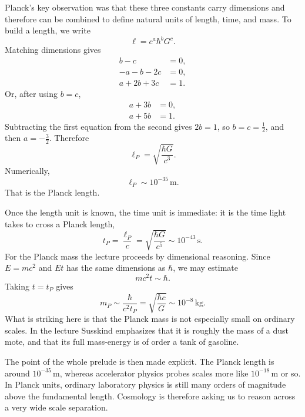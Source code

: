 Planck's key observation was that these three constants carry dimensions and therefore can be combined to define natural units of length, time, and mass. To build a length, we write
\begin{equation}
\ell=c^{a}\hbar^{b}G^{c}.
\end{equation}
Matching dimensions gives
\begin{align}
b-c&=0,\\
-a-b-2c&=0,\\
a+2b+3c&=1.
\end{align}
Or, after using \(b=c\),
\begin{align}
a+3b&=0,\\
a+5b&=1.
\end{align}
Subtracting the first equation from the second gives \(2b=1\), so \(b=c=\tfrac12\), and then \(a=-\tfrac32\). Therefore
\begin{equation}
\ell_{P}=\sqrt{\frac{\hbar G}{c^{3}}}.
\end{equation}
Numerically,
\begin{equation}
\ell_{P}\sim 10^{-35}\,\mathrm{m}.
\end{equation}
That is the Planck length.

Once the length unit is known, the time unit is immediate: it is the time light takes to cross a Planck length,
\begin{equation}
t_{P}=\frac{\ell_{P}}{c}=\sqrt{\frac{\hbar G}{c^{5}}}\sim 10^{-43}\,\mathrm{s}.
\end{equation}
For the Planck mass the lecture proceeds by dimensional reasoning. Since \(E=mc^{2}\) and \(Et\) has the same dimensions as \(\hbar\), we may estimate
\begin{equation}
mc^{2}t\sim \hbar.
\end{equation}
Taking \(t=t_{P}\) gives
\begin{equation}
m_{P}\sim \frac{\hbar}{c^{2}t_{P}}=\sqrt{\frac{\hbar c}{G}}\sim 10^{-8}\,\mathrm{kg}.
\end{equation}
What is striking here is that the Planck mass is not especially small on ordinary scales. In the lecture Susskind emphasizes that it is roughly the mass of a dust mote, and that its full mass-energy is of order a tank of gasoline.

The point of the whole prelude is then made explicit. The Planck length is around \(10^{-35}\,\mathrm{m}\), whereas accelerator physics probes scales more like \(10^{-18}\,\mathrm{m}\) or so. In Planck units, ordinary laboratory physics is still many orders of magnitude above the fundamental length. Cosmology is therefore asking us to reason across a very wide scale separation.

